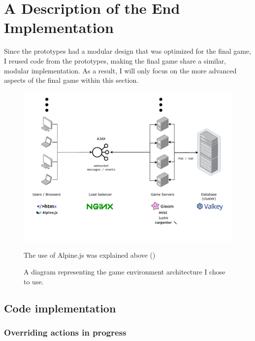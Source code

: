 \documentclass[]{final}
\begin{document}
\chapter{A Description of the End Implementation}
Since the prototypes had a modular design that was optimized for the final game,
I reused code from the prototypes, making the final game share a similar,
modular implementation. As a result, I will only focus on the more advanced
aspects of the final game within this section.

\begin{figure}[H]
  \centering
  \includegraphics[width=\linewidth]{final_architecture}
  \vspace*{-1.5cm}
  \caption{A diagram representing the game environment architecture I chose to use.}
  The use of Alpine.js was explained above {\hypersetup{linkcolor=teal}(\pageref{alpine})}
\end{figure}

\newpage

\section{Code implementation}

\subsection{Overriding actions in progress}
\end{document}
